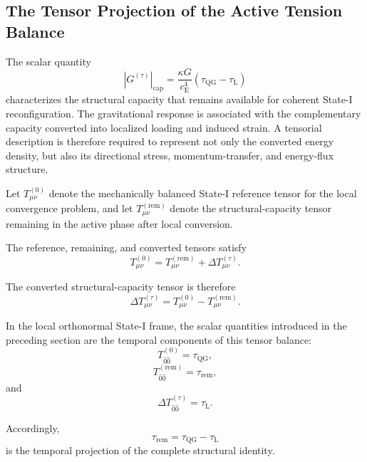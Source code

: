 \subsection{The Tensor Projection of the Active Tension Balance}

The scalar quantity
\begin{equation}
    |G^{(\tau)}|_{\mathrm{cap}} = \frac{\kappa G}{c_{\mathrm{E}}^4} \left( \tau_{\mathrm{QG}} - \tau_{\mathrm{L}} \right)
\end{equation}
characterizes the structural capacity that remains available for coherent State-I reconfiguration. The gravitational response is associated with the complementary capacity converted into localized loading and induced strain. A tensorial description is therefore required to represent not only the converted energy density, but also its directional stress, momentum-transfer, and energy-flux structure.

Let $T_{\mu\nu}^{(0)}$ denote the mechanically balanced State-I reference tensor for the local convergence problem, and let $T_{\mu\nu}^{(\mathrm{rem})}$ denote the structural-capacity tensor remaining in the active phase after local conversion.

The reference, remaining, and converted tensors satisfy
\begin{equation}
    T_{\mu\nu}^{(0)} = T_{\mu\nu}^{(\mathrm{rem})} + \Delta T_{\mu\nu}^{(\tau)}.
\end{equation}

The converted structural-capacity tensor is therefore
\begin{equation}
    \Delta T_{\mu\nu}^{(\tau)} = T_{\mu\nu}^{(0)} - T_{\mu\nu}^{(\mathrm{rem})}.
\end{equation}

In the local orthonormal State-I frame, the scalar quantities introduced in the preceding section are the temporal components of this tensor balance:
\begin{equation}
    T_{\hat{0}\hat{0}}^{(0)} = \tau_{\mathrm{QG}},
\end{equation}
\begin{equation}
    T_{\hat{0}\hat{0}}^{(\mathrm{rem})} = \tau_{\mathrm{rem}},
\end{equation}
and
\begin{equation}
    \Delta T_{\hat{0}\hat{0}}^{(\tau)} = \tau_{\mathrm{L}}.
\end{equation}

Accordingly,
\begin{equation}
    \tau_{\mathrm{rem}} = \tau_{\mathrm{QG}} - \tau_{\mathrm{L}}
\end{equation}
is the temporal projection of the complete structural identity.

